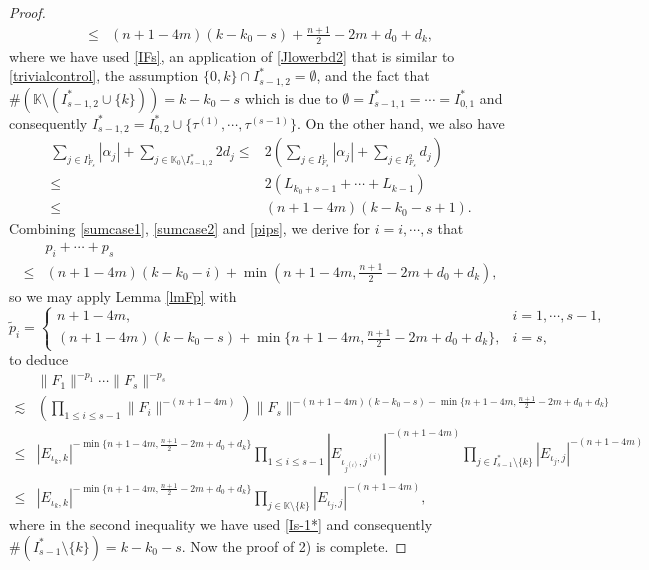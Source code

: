 \documentclass[11pt,reqno]{amsart}
\numberwithin{equation}{section}
\theoremstyle{definition}
\begin{document}
\begin{proof}
\begin{equation}
\begin{split}
			\leq&(n+1-4m)(k-k_0-s)+\mbox{$\frac{n+1}{2}-2m$}+d_0+d_k,
		\end{split}
	\end{equation}
	where we have used \eqref{IFs}, an application of \eqref{Jlowerbd2} that is similar to \eqref{trivialcontrol}, the assumption $\{0,k\}\cap I_{s-1,2}^*=\emptyset$, and the fact that $\#(\mathbb{K}\setminus(I_{s-1,2}^*\cup\{k\}))=k-k_0-s$ which is due to $\emptyset=I_{s-1,1}^*=\cdots=I_{0,1}^*$ and consequently $I_{s-1,2}^*=I_{0,2}^*\cup\{\tau^{(1)},\cdots,\tau^{(s-1)}\}$. On the other hand, we also have
	\begin{equation}\label{sumcase2}
		\begin{split}
			\sum_{j\in I_{F_s}^1}|\alpha_j|+\sum_{j\in\mathbb{K}_0\setminus I_{s-1,2}^*}2d_j\leq&2\left(\sum_{j\in I_{F_s}^1}|\alpha_j|+\sum_{j\in I_{F_s}^2}d_j\right)\\
			\leq&2(L_{k_0+s-1}+\cdots+L_{k-1})\\
			\leq&(n+1-4m)(k-k_0-s+1).
		\end{split}
	\end{equation}
	Combining \eqref{sumcase1}, \eqref{sumcase2} and \eqref{pips}, we derive for $i=i,\cdots,s$ that
	\begin{equation*}
		\begin{split}
			&p_i+\cdots+p_s\\
			\leq&(n+1-4m)(k-k_0-i)+\min(n+1-4m,\mbox{$\frac{n+1}{2}-2m$}+d_0+d_k),
		\end{split}
	\end{equation*}
	so we may apply Lemma \ref{lmFp} with
	\begin{equation*}
		\tilde{p}_i=\begin{cases}
			n+1-4m,\quad&i=1,\cdots,s-1,\\
			(n+1-4m)(k-k_0-s)+\min\{n+1-4m,\mbox{$\frac{n+1}{2}-2m$}+d_0+d_k\},&i=s,
		\end{cases}
	\end{equation*}
	to deduce
	\begin{equation*}
		\begin{split}
			&\|F_1\|^{-p_1}\cdots\|F_s\|^{-p_s}\\
			\lesssim&\left(\prod_{1\leq i\leq s-1}\|F_i\|^{-(n+1-4m)}\right)\|F_s\|^{-(n+1-4m)(k-k_0-s)-\min\{n+1-4m,\frac{n+1}{2}-2m+d_0+d_k\}}\\
			\leq&|E_{\iota_k,k}|^{-\min\{n+1-4m,\frac{n+1}{2}-2m+d_0+d_k\}}\prod_{1\leq i\leq s-1}|E_{\iota_{j^{(i)}},j^{(i)}}|^{-(n+1-4m)}\prod_{j\in I_{s-1}^*\setminus\{k\}}|E_{\iota_j,j}|^{-(n+1-4m)}\\
			\leq&|E_{\iota_k,k}|^{-\min\{n+1-4m,\frac{n+1}{2}-2m+d_0+d_k\}}\prod_{j\in\mathbb{K}\setminus\{k\}}|E_{\iota_j,j}|^{-(n+1-4m)},
		\end{split}
	\end{equation*}
	where in the second inequality we have used \eqref{Is-1*} and consequently $\#(I_{s-1}^*\setminus\{k\})=k-k_0-s$. Now the proof of 2) is complete.
\end{proof}
\end{document}

